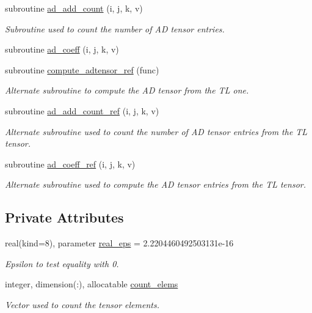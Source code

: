 \begin{DoxyCompactItemize}
subroutine \hyperlink{classmaooam__tl__ad_a8cf9c81589792424f545d4a4a9c57243}{ad\-\_\-add\-\_\-count} (i, j, k, v)
\begin{DoxyCompactList}\small\item\em Subroutine used to count the number of A\-D tensor entries. \end{DoxyCompactList}\item 
subroutine \hyperlink{classmaooam__tl__ad_a48977110f6b5242f34ee0d5b7d75528f}{ad\-\_\-coeff} (i, j, k, v)
\item 
subroutine \hyperlink{classmaooam__tl__ad_ac9448944c562cc07b19d03d8152bf41e}{compute\-\_\-adtensor\-\_\-ref} (func)
\begin{DoxyCompactList}\small\item\em Alternate subroutine to compute the A\-D tensor from the T\-L one. \end{DoxyCompactList}\item 
subroutine \hyperlink{classmaooam__tl__ad_ab661f6cb35357dce6750903d72b5e049}{ad\-\_\-add\-\_\-count\-\_\-ref} (i, j, k, v)
\begin{DoxyCompactList}\small\item\em Alternate subroutine used to count the number of A\-D tensor entries from the T\-L tensor. \end{DoxyCompactList}\item 
subroutine \hyperlink{classmaooam__tl__ad_aeaac0beb5d8987446b867f3eed350858}{ad\-\_\-coeff\-\_\-ref} (i, j, k, v)
\begin{DoxyCompactList}\small\item\em Alternate subroutine used to compute the A\-D tensor entries from the T\-L tensor. \end{DoxyCompactList}\end{DoxyCompactItemize}
\subsection*{Private Attributes}
\begin{DoxyCompactItemize}
\item 
real(kind=8), parameter \hyperlink{classmaooam__tl__ad_a72b14cc94dc63d2edc24926298820c5c}{real\-\_\-eps} = 2.\-2204460492503131e-\/16
\begin{DoxyCompactList}\small\item\em Epsilon to test equality with 0. \end{DoxyCompactList}\item 
integer, dimension(\-:), allocatable \hyperlink{classmaooam__tl__ad_a99e3afa56cd46b38c6420a6e11f8b295}{count\-\_\-elems}
\begin{DoxyCompactList}\small\item\em Vector used to count the tensor elements. \end{DoxyCompactList}\end{DoxyCompactItemize}


